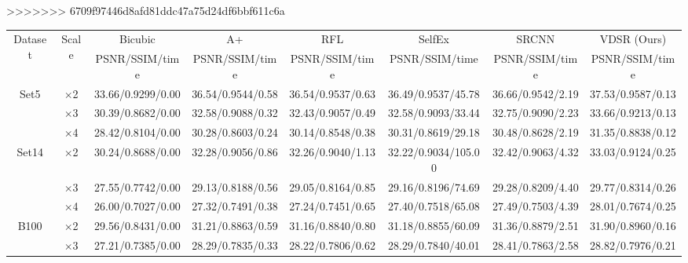 \documentclass[10pt,twocolumn,letterpaper]{article}
\begin{document}
>>>>>>> 6709f97446d8afd81ddc47a75d24df6bbf611c6a
\begin{table}
\begin{center}
\setlength{\tabcolsep}{2pt}
\footnotesize
\begin{tabular}{ | c | c | c | c | c | c | c | c | }
\hline
\multirow{2}{*}{Dataset} & \multirow{2}{*}{Scale} & Bicubic & A+ & RFL & SelfEx & SRCNN & VDSR (Ours)\\
 & & PSNR/SSIM/time & PSNR/SSIM/time & PSNR/SSIM/time & PSNR/SSIM/time & PSNR/SSIM/time & PSNR/SSIM/time\\
\hline
\hline
\multirow{3}{*}{Set5} & $\times$2 & 33.66/0.9299/0.00 & 36.54/{\color{blue}0.9544}/{\color{blue}0.58} & 36.54/0.9537/0.63 & 36.49/0.9537/45.78 & {\color{blue}36.66}/0.9542/2.19 & {\color{red}37.53}/{\color{red}0.9587}/{\color{red}0.13}\\
 & $\times$3 & 30.39/0.8682/0.00 & 32.58/0.9088/{\color{blue}0.32} & 32.43/0.9057/0.49 & 32.58/{\color{blue}0.9093}/33.44 & {\color{blue}32.75}/0.9090/2.23 & {\color{red}33.66}/{\color{red}0.9213}/{\color{red}0.13}\\
 & $\times$4 & 28.42/0.8104/0.00 & 30.28/0.8603/{\color{blue}0.24} & 30.14/0.8548/0.38 & 30.31/0.8619/29.18 & {\color{blue}30.48}/{\color{blue}0.8628}/2.19 & {\color{red}31.35}/{\color{red}0.8838}/{\color{red}0.12}\\
\hline
\hline
\multirow{3}{*}{Set14} & $\times$2 & 30.24/0.8688/0.00 & 32.28/0.9056/{\color{blue}0.86} & 32.26/0.9040/1.13 & 32.22/0.9034/105.00 & {\color{blue}32.42}/{\color{blue}0.9063}/4.32 & {\color{red}33.03}/{\color{red}0.9124}/{\color{red}0.25}\\
 & $\times$3 & 27.55/0.7742/0.00 & 29.13/0.8188/{\color{blue}0.56} & 29.05/0.8164/0.85 & 29.16/0.8196/74.69 & {\color{blue}29.28}/{\color{blue}0.8209}/4.40 & {\color{red}29.77}/{\color{red}0.8314}/{\color{red}0.26}\\
 & $\times$4 & 26.00/0.7027/0.00 & 27.32/0.7491/{\color{blue}0.38} & 27.24/0.7451/0.65 & 27.40/{\color{blue}0.7518}/65.08 & {\color{blue}27.49}/0.7503/4.39 & {\color{red}28.01}/{\color{red}0.7674}/{\color{red}0.25}\\
\hline
\hline
\multirow{3}{*}{B100} & $\times$2 & 29.56/0.8431/0.00 & 31.21/0.8863/{\color{blue}0.59} & 31.16/0.8840/0.80 & 31.18/0.8855/60.09 & {\color{blue}31.36}/{\color{blue}0.8879}/2.51 & {\color{red}31.90}/{\color{red}0.8960}/{\color{red}0.16}\\
 & $\times$3 & 27.21/0.7385/0.00 & 28.29/0.7835/{\color{blue}0.33} & 28.22/0.7806/0.62 & 28.29/0.7840/40.01 & {\color{blue}28.41}/{\color{blue}0.7863}/2.58 & {\color{red}28.82}/{\color{red}0.7976}/{\color{red}0.21}\\

\end{tabular}
\end{center}
\end{table}
\end{document}
